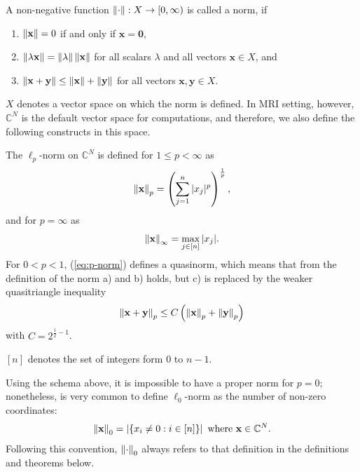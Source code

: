 \begin{tight_equations}

\begin{definition}[norm]
A non-negative function $\left\lVert\cdot\right\rVert: X \rightarrow [0, \infty)$ is called a norm, if 
\begin{enumerate}[label=\alph*)]
    \item $\left\lVert\mathbf{x}\right\rVert = 0$ if and only if $\mathbf{x} = \mathbf{0}$,
    \item $\left\lVert\lambda \mathbf{x}\right\rVert = \Vert \lambda \Vert \left\lVert\mathbf{x}\right\rVert$ for all scalars $\lambda$ and all vectors $\mathbf{x} \in X$, and
    \item $\left\lVert\mathbf{x} + \mathbf{y}\right\rVert \le \left\lVert\mathbf{x}\right\rVert + \left\lVert\mathbf{y}\right\rVert$ for all vectors $\mathbf{x, y} \in X$.
\end{enumerate}
\end{definition}

\begin{remark}
$X$ denotes a vector space on which the norm is defined. In MRI setting, however, $\mathbb{C}^N$ is the default vector space for computations, and therefore, we also define the following constructs in this space.
\end{remark}

\begin{definition}
The $\ell_p$-norm on $\mathbb{C}^N$ is defined for $1 \le p < \infty$ as
\begin{equation}\label{eq:p-norm}
\left\lVert\mathbf{x}\right\rVert_p = \left(\sum_{j=1}^n |x_j|^p\right)^{\frac{1}{p}},
\end{equation}
and for $p = \infty$ as
\[\left\lVert\mathbf{x}\right\rVert_\infty = \max_{j \in [n]} | x_j |.\]
For $0 < p < 1$, (\ref{eq:p-norm}) defines a quasinorm, which means that from the definition of the norm a) and b) holds, but c) is replaced by the weaker quasitriangle inequality
\[\left\lVert\mathbf{x} + \mathbf{y}\right\rVert_p \le C\left(\left\lVert\mathbf{x}\right\rVert_p + \left\lVert\mathbf{y}\right\rVert_p\right)\]
with $C = 2^{\frac{1}{2}-1}$.
\end{definition}

\begin{notation}
$[n]$ denotes the set of integers form $0$ to $n-1$.
\end{notation}

\begin{remark}
Using the schema above, it is impossible to have a proper norm for $p = 0$; nonetheless, is very common to define $\ell_0$-norm as the number of non-zero coordinates:
\[\left\lVert\mathbf{x}\right\rVert_0 = \left| \left\{x_i \ne 0 : i \in [n]\right\}\right| \text{ where } \mathbf{x} \in \mathbb{C}^N.\]
Following this convention, $\left\lVert\cdot\right\rVert_0$ always refers to that definition in the definitions and theorems below.
\end{remark}


\end{tight_equations}
